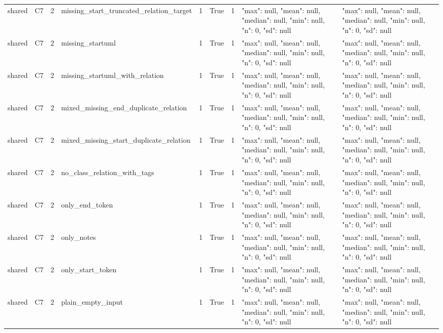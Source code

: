 \begin{tabular}{lllllllll}
shared & C7 & 2 & missing\_start\_truncated\_relation\_target & 1 & True & 1 & {"max": null, "mean": null, "median": null, "min": null, "n": 0, "sd": null} & {"max": null, "mean": null, "median": null, "min": null, "n": 0, "sd": null} \\
shared & C7 & 2 & missing\_startuml & 1 & True & 1 & {"max": null, "mean": null, "median": null, "min": null, "n": 0, "sd": null} & {"max": null, "mean": null, "median": null, "min": null, "n": 0, "sd": null} \\
shared & C7 & 2 & missing\_startuml\_with\_relation & 1 & True & 1 & {"max": null, "mean": null, "median": null, "min": null, "n": 0, "sd": null} & {"max": null, "mean": null, "median": null, "min": null, "n": 0, "sd": null} \\
shared & C7 & 2 & mixed\_missing\_end\_duplicate\_relation & 1 & True & 1 & {"max": null, "mean": null, "median": null, "min": null, "n": 0, "sd": null} & {"max": null, "mean": null, "median": null, "min": null, "n": 0, "sd": null} \\
shared & C7 & 2 & mixed\_missing\_start\_duplicate\_relation & 1 & True & 1 & {"max": null, "mean": null, "median": null, "min": null, "n": 0, "sd": null} & {"max": null, "mean": null, "median": null, "min": null, "n": 0, "sd": null} \\
shared & C7 & 2 & no\_class\_relation\_with\_tags & 1 & True & 1 & {"max": null, "mean": null, "median": null, "min": null, "n": 0, "sd": null} & {"max": null, "mean": null, "median": null, "min": null, "n": 0, "sd": null} \\
shared & C7 & 2 & only\_end\_token & 1 & True & 1 & {"max": null, "mean": null, "median": null, "min": null, "n": 0, "sd": null} & {"max": null, "mean": null, "median": null, "min": null, "n": 0, "sd": null} \\
shared & C7 & 2 & only\_notes & 1 & True & 1 & {"max": null, "mean": null, "median": null, "min": null, "n": 0, "sd": null} & {"max": null, "mean": null, "median": null, "min": null, "n": 0, "sd": null} \\
shared & C7 & 2 & only\_start\_token & 1 & True & 1 & {"max": null, "mean": null, "median": null, "min": null, "n": 0, "sd": null} & {"max": null, "mean": null, "median": null, "min": null, "n": 0, "sd": null} \\
shared & C7 & 2 & plain\_empty\_input & 1 & True & 1 & {"max": null, "mean": null, "median": null, "min": null, "n": 0, "sd": null} & {"max": null, "mean": null, "median": null, "min": null, "n": 0, "sd": null} \\

\end{tabular}
